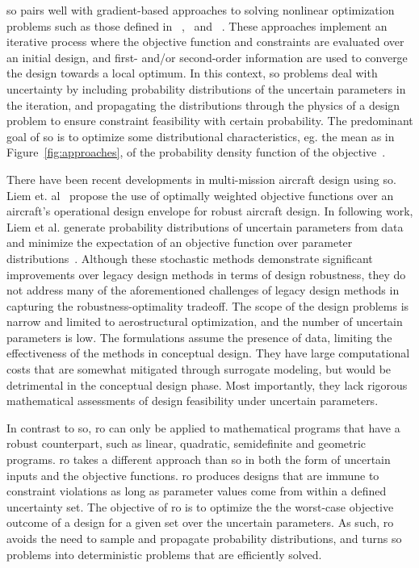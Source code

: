 {\color{blue}\gls{so} pairs well with gradient-based approaches to solving nonlinear optimization problems
such as those defined in ~\cite{Gallard2013},~\cite{Liem2015} and ~\cite{Liem2017}.
These approaches implement an iterative process where
the objective function and constraints are evaluated over an initial design, and first- and/or
second-order information are used to converge the design towards a local optimum.
In this context, \gls{so} problems deal with uncertainty by including
probability distributions of the uncertain parameters in the iteration, and propagating
the distributions through the physics of a design problem to ensure constraint feasibility with certain probability.
The predominant goal of \gls{so} is to optimize some distributional
characteristics, eg. the mean as in Figure~\ref{fig:approaches},
of the probability density function of the objective~\cite{Diwekar2008}.}

{\color{blue}There have been recent developments in multi-mission aircraft design
using \gls{so}.
Liem et. al~\cite{Liem2015} propose the use of optimally
weighted objective functions over an aircraft's operational
design envelope for robust aircraft design.
In following work, Liem et al. generate probability distributions
of uncertain parameters from data
and minimize the expectation of an objective function over
parameter distributions~\cite{Liem2017}.
Although these stochastic methods demonstrate significant improvements over
legacy design methods in terms of design robustness,
they do not address many of the aforementioned challenges of legacy design methods
in capturing the robustness-optimality tradeoff.
The scope of the design problems is narrow and limited to aerostructural optimization,
and the number of uncertain parameters is low.
The formulations assume the presence of data, limiting the
effectiveness of the methods in conceptual design.
They have large computational costs that are somewhat mitigated through
surrogate modeling, but would be detrimental in the conceptual design phase.
Most importantly, they lack rigorous mathematical assessments of design feasibility
under uncertain parameters.}

In contrast to \gls{so},
\gls{ro} can only be applied to mathematical programs that have a robust counterpart,
such as linear, quadratic, semidefinite and geometric programs.
\gls{ro} takes a different approach than \gls{so} in both the form
of uncertain inputs and the objective functions. \gls{ro} produces designs that are
immune to constraint violations as long as parameter values come from within a defined
uncertainty set. The objective of \gls{ro} is to optimize the
the worst-case objective outcome of a design for a
given set over the uncertain parameters. As such,
\gls{ro} avoids the need to sample and propagate probability
distributions, and turns \gls{so} problems into
deterministic problems that are efficiently solved.

